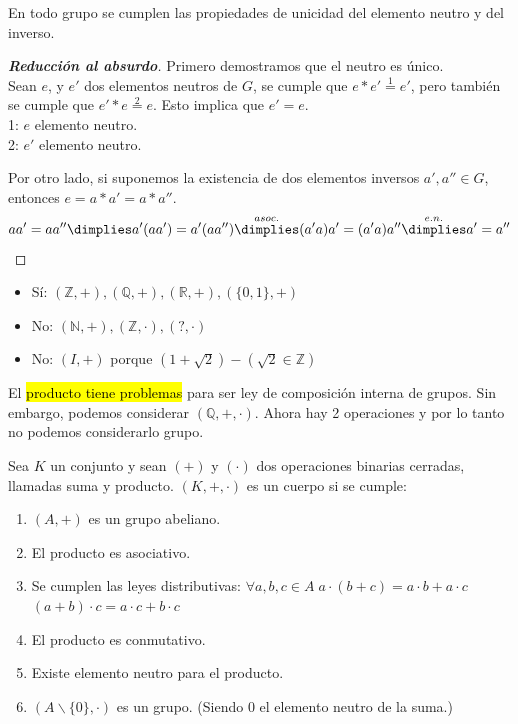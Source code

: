 \documentclass[palatino,nosec]{Docencia}
\begin{document}
\begin{prop}
  En todo grupo se cumplen las propiedades de unicidad del elemento neutro y del inverso.
\end{prop}

\begin{proof}[\textbf{Reducción al absurdo}]
Primero demostramos que el neutro es único. \\
Sean $e$, y $e'$ dos elementos neutros de $G$, se cumple que $e\ast e'\overset{1}{=}e'$, pero también se cumple que $e'\ast e\overset{2}{=}e$. Esto implica que $e'=e$.\\
1: $e$ elemento neutro.\\
2: $e'$ elemento neutro.

Por otro lado, si suponemos la existencia de dos elementos inversos $a',a''\in G$, entonces $e=a\ast a'=a\ast a''$. \\

\[
	aa' = aa'' \dimplies a'(aa') = a'(aa'') \overset{asoc.}{\dimplies} (a'a)a'=(a'a)a'' \overset{e.n.}{\dimplies} a'=a'' 
\]
\end{proof}

\begin{example}
	\begin{itemize}
		\item Sí: $(ℤ,+),(ℚ,+),(ℝ,+),(\{0,1\},+)$
		\item No: $(ℕ,+),(ℤ,·),(?,·)$
		\item No: $(I,+)$ porque $(1+\sqrt{2}) - (\sqrt{2}\in ℤ)$
	\end{itemize}
\end{example}


El \hl{producto tiene problemas} para ser ley de composición interna de grupos. 
%
Sin embargo, podemos considerar $(ℚ,+,·)$. 
%
Ahora hay 2 operaciones y por lo tanto no podemos considerarlo grupo.


\begin{defn}[Cuerpo] 
Sea $K$ un conjunto y sean $(+)$ y $(·)$ dos operaciones binarias cerradas, llamadas suma y producto. 
%
$(K,+,·)$ es un cuerpo si se cumple:
\begin{enumerate}
\item $(A, +)$ es un grupo abeliano.
\item El producto es asociativo.
\item Se cumplen las leyes distributivas: 
	\subitem $\forall a,b,c \in A \; a\cdot(b+c)=a\cdot b + a\cdot c$ 
	\subitem $(a+b)\cdot c= a \cdot c + b \cdot c$
\item El producto es conmutativo.
\item Existe elemento neutro para el producto.
\item $\left(A\backslash \{0\},·\right)$ es un grupo. (Siendo 0 el elemento neutro de la suma.)
\end{enumerate}
\end{defn}
\end{document}
